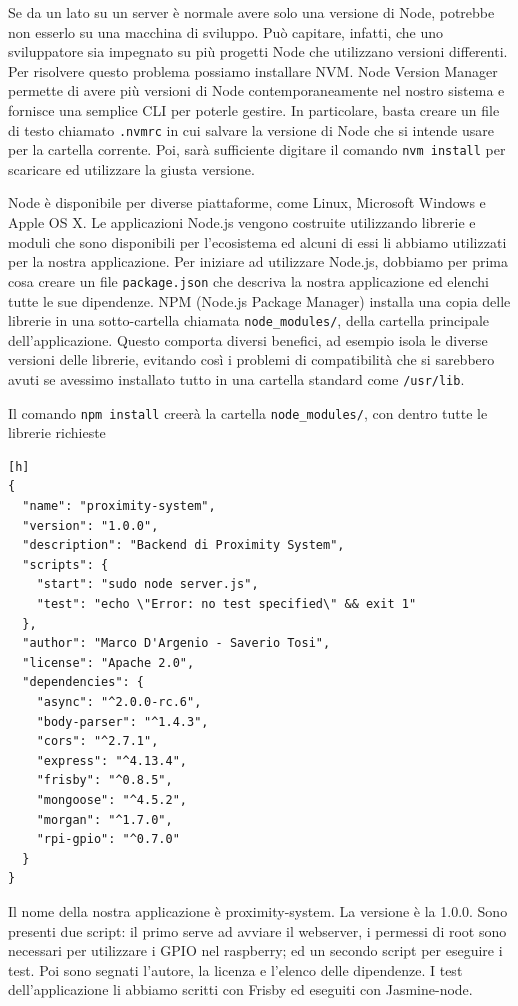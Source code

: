 Se da un lato su un server è normale avere solo una versione di Node, potrebbe non esserlo su una macchina di sviluppo.
Può capitare, infatti, che uno sviluppatore sia impegnato su più progetti Node che utilizzano versioni differenti.
Per risolvere questo problema possiamo installare NVM.
Node Version Manager permette di avere più versioni di Node contemporaneamente nel nostro sistema e fornisce una semplice CLI per poterle gestire.
In particolare, basta creare un file di testo chiamato \texttt{.nvmrc} in cui salvare la versione di Node che si intende usare per la cartella corrente.
Poi, sarà sufficiente digitare il comando \texttt{nvm install} per scaricare ed utilizzare la giusta versione.

Node è disponibile per diverse piattaforme, come Linux, Microsoft Windows e Apple OS X.
Le applicazioni Node.js vengono costruite utilizzando librerie e moduli che sono disponibili per l'ecosistema ed alcuni di essi li abbiamo utilizzati per la nostra applicazione.
Per iniziare ad utilizzare Node.js, dobbiamo per prima cosa creare un file \texttt{package.json} che descriva la nostra applicazione ed elenchi tutte le sue dipendenze.
NPM (Node.js Package Manager) installa una copia delle librerie in una sotto-cartella chiamata \texttt{node\_modules/}, della cartella principale dell'applicazione. 
Questo comporta diversi benefici, ad esempio isola le diverse versioni delle librerie, evitando così i problemi di compatibilità che si sarebbero avuti se avessimo installato tutto in una cartella standard come \texttt{/usr/lib}.

Il comando \texttt{npm install} creerà la cartella \texttt{node\_modules/}, con dentro tutte le librerie richieste

\begin{lstlisting}[caption={package.json}, style=javaScriptCode][h]
{
  "name": "proximity-system",
  "version": "1.0.0",
  "description": "Backend di Proximity System",
  "scripts": {
    "start": "sudo node server.js",
    "test": "echo \"Error: no test specified\" && exit 1"
  },
  "author": "Marco D'Argenio - Saverio Tosi",
  "license": "Apache 2.0",
  "dependencies": {
    "async": "^2.0.0-rc.6",
    "body-parser": "^1.4.3",
    "cors": "^2.7.1",
    "express": "^4.13.4",
    "frisby": "^0.8.5",
    "mongoose": "^4.5.2",
    "morgan": "^1.7.0",
    "rpi-gpio": "^0.7.0"
  }
}
\end{lstlisting}

Il nome della nostra applicazione è proximity-system. 
La versione è la 1.0.0. 
Sono presenti due script: il primo serve ad avviare il webserver, i permessi di root sono necessari per utilizzare i GPIO nel raspberry; ed un secondo script per eseguire i test. 
Poi sono segnati l'autore, la licenza e l'elenco delle dipendenze. 
I test dell'applicazione li abbiamo scritti con Frisby ed eseguiti con Jasmine-node.

